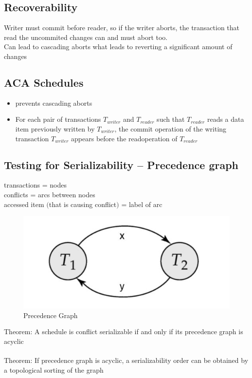 		\subsection{Recoverability}
			Writer must commit before reader, so if the writer aborts, the transaction that read the uncommited changes can and must abort too.\\
			Can lead to cascading aborts what leads to reverting a significant amount of changes
		\subsection{ACA Schedules}
			\begin{itemize}
				\item prevents cascading aborts
				\item For each pair of transactions $ T_{writer} $ and $ T_{reader} $ such that $ T_{reader} $ reads a data item previously written by $ T_{writer} $, the commit operation of the writing  transaction $ T_{writer} $ appears before the readoperation of $ T_{reader} $ 
			\end{itemize}
		\subsection{Testing for Serializability -- Precedence graph}
			transactions = nodes \\
			conflicts = arcs between nodes\\
			accessed item $ ( $that is causing conflict$) $ = label of arc\\
			
			\begin{figure}[h!]
				\includegraphics[scale=0.5]{res/precedence_graph_serializable.jpg}
				\caption{Precedence Graph}
			\end{figure}

		Theorem: A schedule is conflict serializable if and only if its precedence graph is acyclic\\
		\\
		Theorem: If precedence graph is acyclic, a serializability order can be obtained by a topological sorting of the graph
		
